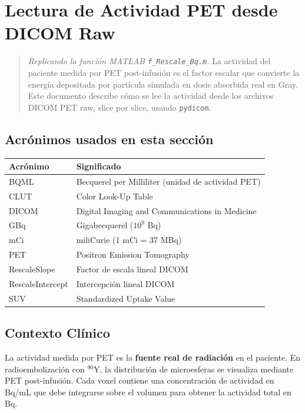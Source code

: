 \documentclass[12pt,a4paper]{article}
\begin{document}
\newpage

\section{Lectura de Actividad PET desde DICOM Raw}

\begin{quote}
\textit{Replicando la función MATLAB \texttt{f\_Rescale\_Bq.m}.} La actividad del paciente medida por PET post-infusión es el factor escalar que convierte la energía depositada por partícula simulada en dosis absorbida real en Gray. Este documento describe cómo se lee la actividad desde los archivos DICOM PET raw, slice por slice, usando \texttt{pydicom}.
\end{quote}

\subsection*{Acrónimos usados en esta sección}

\begin{tabular}{p{3cm} p{12cm}}
\toprule
\textbf{Acrónimo} & \textbf{Significado} \\
\midrule
BQML & Becquerel per Milliliter (unidad de actividad PET) \\
CLUT & Color Look-Up Table \\
DICOM & Digital Imaging and Communications in Medicine \\
GBq & Gigabecquerel ($10^9$ Bq) \\
mCi & miliCurie (1 mCi = 37 MBq) \\
PET & Positron Emission Tomography \\
RescaleSlope & Factor de escala lineal DICOM \\
RescaleIntercept & Intercepción lineal DICOM \\
SUV & Standardized Uptake Value \\
\bottomrule
\end{tabular}

\subsection{Contexto Clínico}

La actividad medida por PET es la \textbf{fuente real de radiación} en el paciente. En radioembolización con $^{90}$Y, la distribución de microesferas se visualiza mediante PET post-infusión. Cada voxel contiene una concentración de actividad en Bq/mL que debe integrarse sobre el volumen para obtener la actividad total en Bq.
\end{document}
